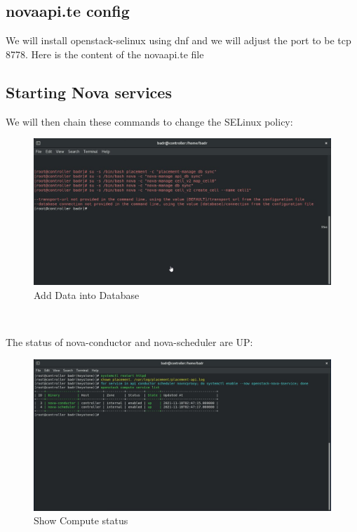 \begin{spacing}{1.2}
\subsection{novaapi.te config}
\par We will install openstack-selinux using dnf and we will adjust the port to be
tcp 8778. Here is the content of the novaapi.te file 
\\
\subsection{Starting Nova services}
\par We will then chain these commands to change the SELinux policy: 
\\

\begin{figure}[!htb] 
\begin{center} 
\includegraphics[width=1\linewidth]{Cloud/Installing and Configuring Nova services/Add Data into Database} 
\end{center} 
\caption{Add Data into Database} 
\end{figure}  \FloatBarrier 
\\
\par The status of nova-conductor and nova-scheduler are UP: 
\\
\begin{figure}[!htb] 
\begin{center} 
\includegraphics[width=1\linewidth]{Cloud/Installing and Configuring Nova services/Show Compute status} 
\end{center} 
\caption{Show Compute status} 
\end{figure}  \FloatBarrier 
\\

\end{spacing}

